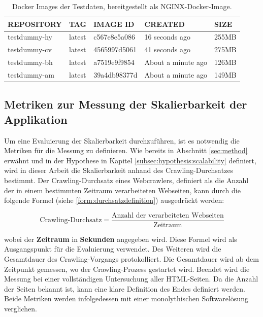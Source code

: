 \begin{table}[H]
\centering
\begin{tabular}{|l|l|l|l|l|}
\hline
\textbf{REPOSITORY} & \textbf{TAG} & \textbf{IMAGE ID} & \textbf{CREATED} & \textbf{SIZE} \\ \hline
testdummy-hy & latest & c567e8e5a086 & 16 seconds ago & 255MB \\ \hline
testdummy-cv & latest & 4565997d5061 & 41 seconds ago & 275MB \\ \hline
testdummy-bh & latest & a7519e9f9854 & About a minute ago & 126MB \\ \hline
testdummy-am & latest & 39a4db98377d & About a minute ago & 149MB \\ \hline
\end{tabular}
\caption{Docker Images der Testdaten, bereitgestellt als NGINX-Docker-Image.}
\label{table:docker_images}
\end{table}


\subsection{Metriken zur Messung der Skalierbarkeit der Applikation} \label{}
Um eine Evaluierung der Skalierbarkeit durchzuführen, ist es notwendig die Metriken für die Messung zu definieren. Wie bereits in Abschnitt \ref{sec:method} erwähnt und in der Hypothese in Kapitel \ref{subsec:hypothesis:scalability} definiert, wird in dieser Arbeit die Skalierbarkeit anhand des Crawling-Durchsatzes bestimmt. Der Crawling-Durchsatz eines Webcrawlers, definiert als die Anzahl der in einem bestimmten Zeitraum verarbeiteten Webseiten, kann durch die folgende Formel (siehe \ref{form:durchsatzdefinition}) ausgedrückt werden:

\begin{equation}
    \text{Crawling-Durchsatz} = \frac{\text{Anzahl der verarbeiteten Webseiten}}{\text{Zeitraum}}
    \label{form:durchsatzdefinition}
\end{equation}

wobei der \textbf{Zeitraum} in \textbf{Sekunden} angegeben wird.\newline \newline
Diese Formel wird als Ausgangspunkt für die Evaluierung verwendet. Des Weiteren wird die Gesamtdauer des Crawling-Vorgangs protokolliert. Die Gesamtdauer wird ab dem Zeitpunkt gemessen, wo der Crawling-Prozess gestartet wird. Beendet wird die Messung bei einer vollständigen Untersuchung aller HTML-Seiten. Da die Anzahl der Seiten bekannt ist, kann eine klare Definition des Endes definiert werden. Beide Metriken werden infolgedessen mit einer monolythischen Softwarelösung verglichen.
